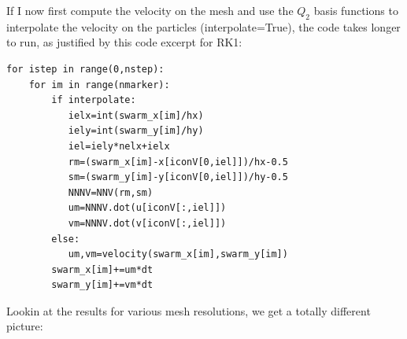 If I now first compute the velocity on the mesh and use the $Q_2$ basis functions to interpolate the 
velocity on the particles ({\python interpolate}=True), the code takes longer to run, as 
justified by this code excerpt for RK1:
\begin{lstlisting}
for istep in range(0,nstep):
    for im in range(nmarker):
        if interpolate:
           ielx=int(swarm_x[im]/hx)
           iely=int(swarm_y[im]/hy)
           iel=iely*nelx+ielx
           rm=(swarm_x[im]-x[iconV[0,iel]])/hx-0.5
           sm=(swarm_y[im]-y[iconV[0,iel]])/hy-0.5
           NNNV=NNV(rm,sm)
           um=NNNV.dot(u[iconV[:,iel]])
           vm=NNNV.dot(v[iconV[:,iel]])
        else:
           um,vm=velocity(swarm_x[im],swarm_y[im])
        swarm_x[im]+=um*dt
        swarm_y[im]+=vm*dt
\end{lstlisting}

\newpage
Lookin at the results for various mesh resolutions, we get a totally different picture:

